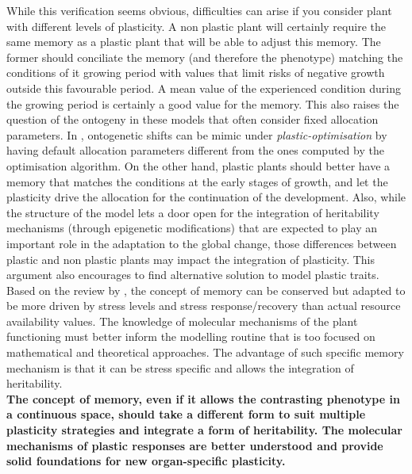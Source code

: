 While this verification seems obvious, difficulties can arise if you consider plant with different levels of plasticity. A non plastic plant will certainly require the same memory as a plastic plant that will be able to adjust this memory. The former should conciliate the memory (and therefore the phenotype) matching the conditions of it growing period with values that limit risks of negative growth outside this favourable period. A mean value of the experienced condition during the growing period is certainly a good value for the memory. This also raises the question of the ontogeny in these models that often consider fixed allocation parameters. In \model, ontogenetic shifts can be mimic under \textit{plastic-optimisation} by having default allocation parameters different from the ones computed by the optimisation algorithm. On the other hand, plastic plants should better have a memory that matches the conditions at the early stages of growth, and let the plasticity drive the allocation for the continuation of the development. Also, while the structure of the model lets a door open for the integration of heritability mechanisms (through epigenetic modifications) that are expected to play an important role in the adaptation to the global change, those differences between plastic and non plastic plants may impact the integration of plasticity. This argument also encourages to find alternative solution to model plastic traits. Based on the review by \citet{crisp_reconsidering_2016}, the concept of memory can be conserved but adapted to be more driven by stress levels and stress response/recovery than actual resource availability values. The knowledge of molecular mechanisms of the plant functioning must better inform the modelling routine that is too focused on mathematical and theoretical approaches. The advantage of such specific memory mechanism is that it can be stress specific  and allows the integration of heritability.\\

\textbf{The concept of memory, even if it allows the contrasting phenotype in a continuous space, should take a different form to suit multiple plasticity strategies and integrate a form of heritability. The molecular mechanisms of plastic responses are better understood and provide solid foundations for new organ-specific plasticity.}

